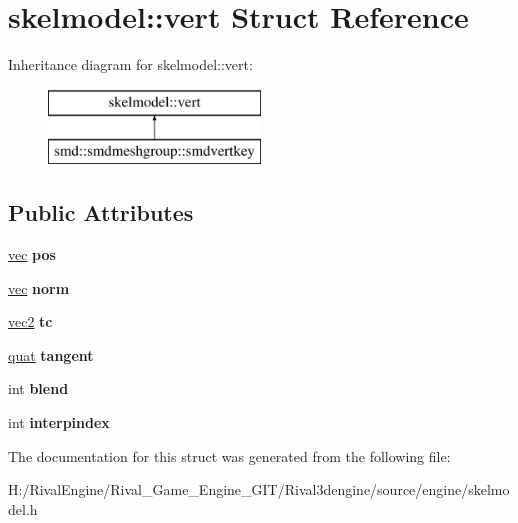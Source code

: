 \hypertarget{structskelmodel_1_1vert}{}\section{skelmodel\+:\+:vert Struct Reference}
\label{structskelmodel_1_1vert}
Inheritance diagram for skelmodel\+:\+:vert\+:\begin{figure}[H]
\begin{center}
\leavevmode
\includegraphics[height=2.000000cm]{structskelmodel_1_1vert}
\end{center}
\end{figure}
\subsection*{Public Attributes}
\begin{DoxyCompactItemize}
\item 
\mbox{\label{structskelmodel_1_1vert_a4d26b537021654fc1cebb6e30e4a5b6a}} 
\hyperlink{structvec}{vec} {\bfseries pos}
\item 
\mbox{\label{structskelmodel_1_1vert_afc6f3e6bc799c7ba7c1abc842acab97b}} 
\hyperlink{structvec}{vec} {\bfseries norm}
\item 
\mbox{\label{structskelmodel_1_1vert_a44a724b7c8b9aba9f3777357bc4f97d8}} 
\hyperlink{structvec2}{vec2} {\bfseries tc}
\item 
\mbox{\label{structskelmodel_1_1vert_ae32e0e9044bad84206c3cf6a1657b372}} 
\hyperlink{structquat}{quat} {\bfseries tangent}
\item 
\mbox{\label{structskelmodel_1_1vert_ab3dfdbeca4f8594820b38097d69b8132}} 
int {\bfseries blend}
\item 
\mbox{\label{structskelmodel_1_1vert_a1b2d5aa468433536b4988c9236746586}} 
int {\bfseries interpindex}
\end{DoxyCompactItemize}


The documentation for this struct was generated from the following file\+:\begin{DoxyCompactItemize}
\item 
H\+:/\+Rival\+Engine/\+Rival\+\_\+\+Game\+\_\+\+Engine\+\_\+\+G\+I\+T/\+Rival3dengine/source/engine/skelmodel.\+h\end{DoxyCompactItemize}
